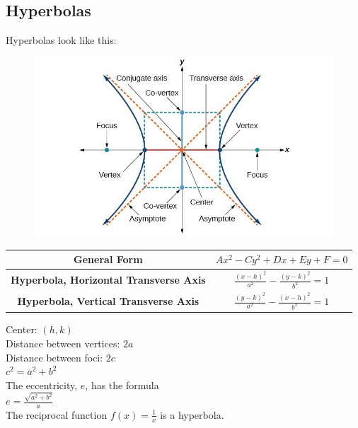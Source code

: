     \subsection{Hyperbolas}
        Hyperbolas look like this: \\
        \begin{figure} [hbt!]
            \centering
            \includegraphics [scale=0.3] {Resources/Unit10Conics/hyperbola.png}
        \end{figure}

        \begin{center}
            \begin{tabular} {|c|c|}
                \hline
                \textbf{General Form}
                & $Ax^2-Cy^2+Dx+Ey+F=0$                       \\
                \hline
                \textbf{Hyperbola, Horizontal Transverse Axis}
                & $\frac{(x-h)^2}{a^2}-\frac{(y-k)^2}{b^2}=1$ \\
                \hline
                \textbf{Hyperbola, Vertical Transverse Axis}
                & $\frac{(y-k)^2}{a^2}-\frac{(x-h)^2}{b^2}=1$ \\
                \hline
            \end{tabular}
        \end{center}

        \noindent Center: $(h,k)$ \\
        Distance between vertices: $2a$ \\
        Distance between foci: $2c$ \\
        $c^2=a^2+b^2$ \\

        \noindent The eccentricity, $e$, has the formula \\
        $e=\frac{\sqrt{a^2+b^2}}{a}$  \\

        \noindent The reciprocal function $f(x)=\frac{1}{x}$ is a hyperbola.